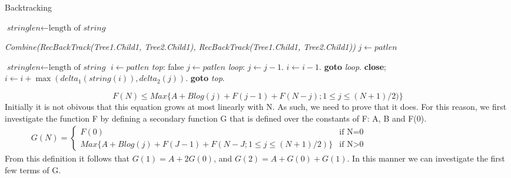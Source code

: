 \begin{algorithm}
	\caption{Backtracking}\label{euclid}
	\begin{algorithmic}[1]
		
		\State $\textit{stringlen} \gets \text{length of }\textit{string}$
		
		 \Return \textit{Combine(RecBackTrack(Tree1.Child1, Tree2.Child1), RecBackTrack(Tree1.Child1, Tree2.Child1))}
		\EndIf
		\State $j \gets \textit{patlen}$
		
		
		
		
		\State $\textit{stringlen} \gets \text{length of }\textit{string}$
		\State $i \gets \textit{patlen}$
		\BState \emph{top}:
		 \Return false
		\EndIf
		\State $j \gets \textit{patlen}$
		\BState \emph{loop}:
		\State $j \gets j-1$.
		\State $i \gets i-1$.
		\State \textbf{goto} \emph{loop}.
		\State \textbf{close};
		\EndIf
		\State $i \gets i+\max(\textit{delta}_1(\textit{string}(i)),\textit{delta}_2(j))$.
		\State \textbf{goto} \emph{top}.
		\EndProcedure
	\end{algorithmic}
\end{algorithm}


\begin{equation}
	F(N) \le Max\{A + Blog(j) + F(j-1) + F(N-j); 1 \le j \le (N+1)/2)\}	
\end{equation}
Initially it is not obivous that this equation grows at most linearly with N. As such, we need to prove that it does. For this reason, we first investigate the function F by defining a secondary function G that is defined over the constants of F: A, B and F(0).
	\begin{equation*}
	\begin{aligned}
	G(N)=
	\begin{cases}
	F(0) & \text{if N=0}
	\\
	Max\{A + Blog(j) + F(J-1) + F(N-J; 1 \le j \le (N+1)/2)\} & \text{if N>0}             
	\end{cases}
	\end{aligned}
	\phantom{\hspace{6cm}}
	\end{equation*}
From this definition it follows that $G(1)= A + 2G(0)$, and $G(2)=A + G(0) + G(1)$. In this manner we can investigate the first few terms of G.

